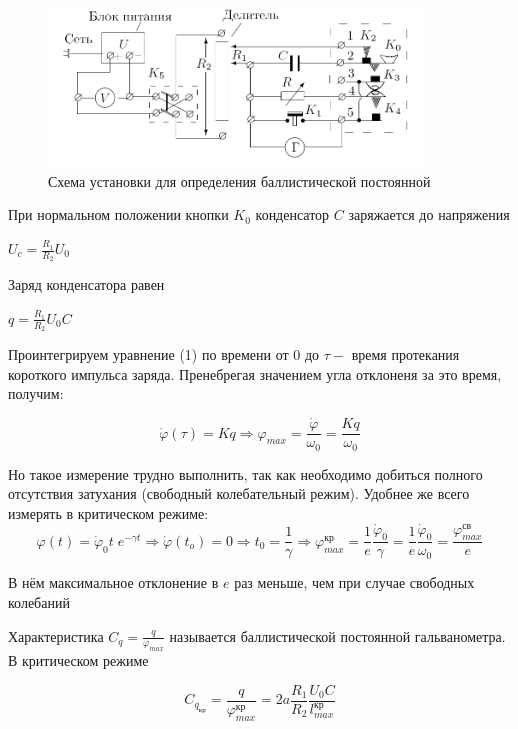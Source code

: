 \documentclass[a4paper]{article}
\begin{document}
\begin{figure}[h]
    \centering
    \includegraphics[width=10cm]{images/fig2.PNG}
    \caption{Схема установки для определения баллистической постоянной}
    \label{fig:vac}
\end{figure}

При нормальном положении кнопки $K_0$ конденсатор $C$ заряжается до напряжения
\begin{center}
    $U_c = \frac{R_1}{R_2}U_0$
\end{center}
Заряд конденсатора равен
\begin{center}
    $q = \frac{R_1}{R_2}U_0 C$
\end{center}

Проинтегрируем уравнение (1) по времени от 0 до \(\tau - \)
время протекания короткого импульса заряда. Пренебрегая значением угла отклоненя за это время, получим:

\begin{equation}
    \dot \varphi (\tau) = Kq \Rightarrow \varphi_{max} = \frac{\dot \varphi}{\omega_{0}} = \frac{Kq}{\omega_{0}}
\end{equation}

Но такое измерение трудно выполнить, так как необходимо добиться полного отсутствия затухания (свободный колебательный режим). Удобнее же всего измерять в критическом режиме: 
\begin{equation}
    \varphi(t) = \dot \varphi_{0}t\; e^{-\gamma t} \Rightarrow \dot \varphi(t_{o}) = 0 \Rightarrow t_{0} = \frac{1}{\gamma} \Rightarrow \varphi_{max}^{\text{кр}} =  \frac{1}{e} \frac{\dot \varphi_{0}}{\gamma} =  \frac{1}{e} \frac{\dot \varphi_{0}}{\omega_{0}} = \frac{\varphi_{max}^{\text{св}}}{e}
\end{equation}

В нём максимальное отклонение в \(e\) раз меньше, чем при случае свободных колебаний

Характеристика \(C_{q} = \frac{q}{\varphi_{max}}\) называется баллистической постоянной гальванометра. В критическом режиме 

\begin{equation}
    C_{q_{\text{кр}}} = \frac{q}{\varphi_{max}^{\text{кр}}} = 2a\frac{R_1}{R_2} \frac{U_0 C}{l_{max}^{\text{кр}}}
\end{equation}
\end{document}
